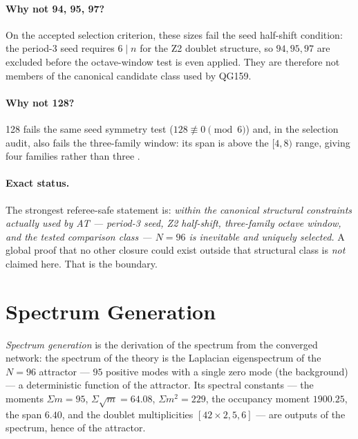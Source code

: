 \paragraph{Why not 94, 95, 97?}
On the accepted selection criterion, these sizes fail the seed half-shift condition: the
period-3 seed requires $6 \mid n$ for the Z2 doublet structure, so $94,95,97$ are excluded
before the octave-window test is even applied. They are therefore not members of the
canonical candidate class used by QG159.

\paragraph{Why not 128?}
128 fails the same seed symmetry test ($128 \not\equiv 0 \pmod 6$) and, in the selection
audit, also fails the three-family window: its span is above the $[4,8)$ range, giving four
families rather than three \cite{c05:QG159}.

\paragraph{Exact status.}
The strongest referee-safe statement is: \emph{within the canonical structural constraints
actually used by AT --- period-3 seed, Z2 half-shift, three-family octave window, and the
tested comparison class --- $N=96$ is inevitable and uniquely selected.} A global proof that
no other closure could exist outside that structural class is \emph{not} claimed here.
That is the boundary.

\section{Spectrum Generation}
\label{c05:sec:spectrum-generation}

\begin{theorem}
\label{c05:thm:spectrum-eigenspectrum}
\emph{Spectrum generation} is the derivation of the spectrum from the converged network: the
spectrum of the theory is the Laplacian eigenspectrum of the $N=96$ attractor --- $95$
positive modes with a single zero mode (the background) --- a deterministic function of the
attractor. Its spectral constants --- the moments $\Sigma m=95$,
$\Sigma\sqrt{m}=64.08$, $\Sigma m^2=229$, the occupancy moment $1900.25$, the span $6.40$,
and the doublet multiplicities $[42\times2,5,6]$ --- are outputs of the spectrum, hence of
the attractor.
\end{theorem}

